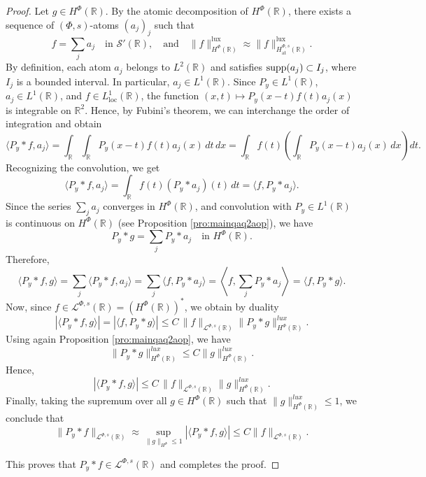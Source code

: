 \documentclass[a4paper,12pt,intlimits,oneside]{amsart}
\theoremstyle{definition}
\numberwithin{equation}{section}
\def\supp{{\rm supp}}
\theoremstyle{definition}
\begin{document}
  \begin{proof}
  Let $g \in H^{\Phi}(\mathbb{R})$. By the atomic decomposition of $H^{\Phi}(\mathbb{R})$, there exists a sequence of $(\Phi,s)$-atoms $(a_j)_j$ such that
  \[
  f=\sum_{j} a_j \quad \text{in } \mathscr{S}'(\mathbb{R}),
  \quad\text{and}\quad
  \|f\|_{H^{\Phi}(\mathbb{R})}^{\mathrm{lux}}
  \approx 
  \|f\|_{H^{\Phi,s}_{\mathrm{at}}(\mathbb{R})}^{\mathrm{lux}}.
  \]
 By definition, each atom $a_j$ belongs to $L^{2}(\mathbb{R})$ and satisfies $\supp(a_j)\subset I_j$, where $I_j$ is a bounded interval. In particular, $a_j \in L^1(\mathbb{R})$. Since $P_y \in L^1(\mathbb{R})$, $a_j \in L^1(\mathbb{R})$, and $f \in L^1_{\mathrm{loc}}(\mathbb{R})$, the function $(x,t) \mapsto P_y(x-t)f(t)a_j(x)$ is integrable on $\mathbb{R}^2$. Hence, by Fubini's theorem, we can interchange the order of integration and obtain
  \[
  \langle P_y * f, a_j \rangle
  = \int_{\mathbb{R}} \int_{\mathbb{R}} P_y(x-t) f(t) a_j(x)\,dt\,dx
  = \int_{\mathbb{R}} f(t) \left( \int_{\mathbb{R}} P_y(x-t) a_j(x)\,dx \right) dt.
  \]
  Recognizing the convolution, we get
  \[
  \langle P_y * f, a_j \rangle = \int_{\mathbb{R}} f(t) (P_y * a_j)(t)\,dt = \langle f, P_y * a_j \rangle.
  \]
 Since the series $\sum_j a_j$ converges in $H^{\Phi}(\mathbb{R})$, and convolution with $P_y \in L^1(\mathbb{R})$ is continuous on $H^{\Phi}(\mathbb{R})$ (see Proposition \ref{pro:mainqaq2aop}), we have
  \[
  P_y * g = \sum_j P_y * a_j \quad \text{in } H^{\Phi}(\mathbb{R}).
  \]
  Therefore,
  \[
  \langle P_y * f, g \rangle
  = \sum_j \langle P_y * f, a_j \rangle
  = \sum_j \langle f, P_y * a_j \rangle
  = \left\langle f, \sum_j P_y * a_j \right\rangle
  = \langle f, P_y * g \rangle.
  \]
Now, since $f \in \mathcal{L}^{\Phi,s}(\mathbb{R}) = (H^{\Phi}(\mathbb{R}))^*$, we obtain by duality
  \[
  |\langle P_y * f, g \rangle|
  = |\langle f, P_y * g \rangle|
  \le C\, \|f\|_{\mathcal{L}^{\Phi,s}(\mathbb{R})} \|P_y * g\|_{H^{\Phi}(\mathbb{R})}^{lux}.
  \]
  Using again Proposition \ref{pro:mainqaq2aop}, we have
  \[
  \|P_y * g\|_{H^{\Phi}(\mathbb{R})}^{lux} \le C \|g\|_{H^{\Phi}(\mathbb{R})}^{lux}.
  \]
  Hence,
  \[
  |\langle P_y * f, g \rangle|
  \le C\, \|f\|_{\mathcal{L}^{\Phi,s}(\mathbb{R})} \|g\|_{H^{\Phi}(\mathbb{R})}^{lux}.
  \]
Finally, taking the supremum over all $g \in H^{\Phi}(\mathbb{R})$ such that $\|g\|_{H^{\Phi}(\mathbb{R})}^{lux} \le 1$, we conclude that
  \[
  \|P_y * f\|_{\mathcal{L}^{\Phi,s}(\mathbb{R})}
  \approx \sup_{\|g\|_{H^{\Phi}} \le 1} |\langle P_y * f, g \rangle|
  \le C \|f\|_{\mathcal{L}^{\Phi,s}(\mathbb{R})}.
  \]
  
  This proves that $P_y * f \in \mathcal{L}^{\Phi,s}(\mathbb{R})$ and completes the proof.
  \end{proof}
  
\end{document}

